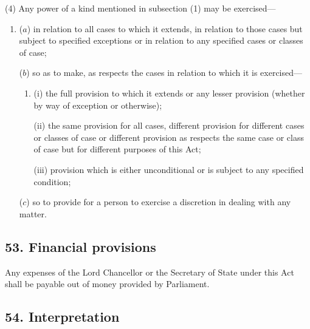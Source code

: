 \documentclass[12pt,a4paper]{article}
\begin{document}
(4) Any power of a kind mentioned in subsection (1)  may be exercised—
\begin{enumerate}\item[]
($a$) in relation to all cases to which it extends, in relation to those cases but subject to specified exceptions or in relation to any specified cases or classes of case;

($b$) so as to make, as respects the cases in relation to which it is exercised—
\begin{enumerate}\item[]
(i) the full provision to which it extends or any lesser provision (whether by way of exception or otherwise);

(ii) the same provision for all cases, different provision for different cases or classes of case or different provision as respects the same case or class of case but for different purposes of this Act;

(iii) provision which is either unconditional or is subject to any specified condition;
\end{enumerate}

($c$) so to provide for a person to exercise a discretion in dealing with any matter.
\end{enumerate}


\subsection{53. Financial provisions}

Any expenses of the Lord Chancellor or the Secretary of State under this Act shall be payable out of money provided by Parliament.


\subsection{54. Interpretation}
\end{document}
